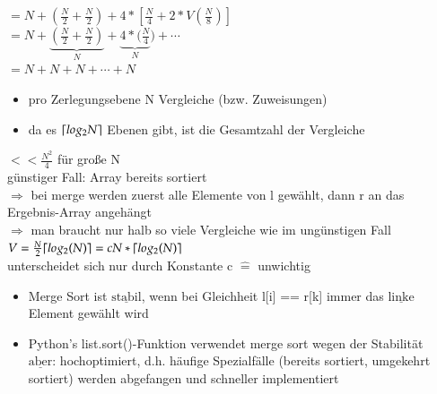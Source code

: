 \documentclass[11pt, fleqn]{scrreprt}
\DeclarePairedDelimiter\ceil{\lceil}{\rceil}
\begin{document}
        \hspace*{19.5mm} $= N + (\frac{N}{2} + \frac{N}{2}) + 4 * [\frac{N}{4} + 2 * V(\frac{N}{8})] $\\

        \hspace*{19.5mm} $= N + \underbrace{(\frac{N}{2} + \frac{N}{2})}_{N} + \underbrace{4 * (\frac{N}{4}}_{N}) + \cdots $\\

        \hspace*{19.5mm} $= N + N + N + \cdots + N$

        \begin{itemize}[label={$\Rightarrow$}]
            \item pro Zerlegungsebene N Vergleiche (bzw. Zuweisungen)
            \item da es $\ceil{log_2 N}$ Ebenen gibt, ist die Gesamtzahl der Vergleiche
        \end{itemize}

        \hspace*{5mm}  $<< \frac{N^2}{4}$ für große N \\


        günstiger Fall: Array bereits sortiert \\

        $\Rightarrow$ bei merge werden zuerst alle Elemente von l gewählt, dann r an das Ergebnis-Array angehängt \\

        $\Rightarrow$ man braucht nur halb so viele Vergleiche wie im ungünstigen Fall \\

        \hspace*{5mm} $V= \frac{N}{2} \ceil{log_2(N)} = c N * \ceil{log_2(N)}$ \\

        unterscheidet sich nur durch Konstante c $\widehat{=}$ unwichtig \\

        \begin{itemize}
            \item Merge Sort ist $\underline{\text{stabil}}$, wenn bei Gleichheit l[i] == r[k] immer das $\underline{\text{linke}}$ Element gewählt wird
            \item Python's list.sort()-Funktion verwendet merge sort wegen der Stabilität\\
            $\underline{\text{aber}}$: hochoptimiert, d.h. häufige Spezialfälle (bereits sortiert, umgekehrt sortiert) werden abgefangen und schneller implementiert
        \end{itemize}
\end{document}
